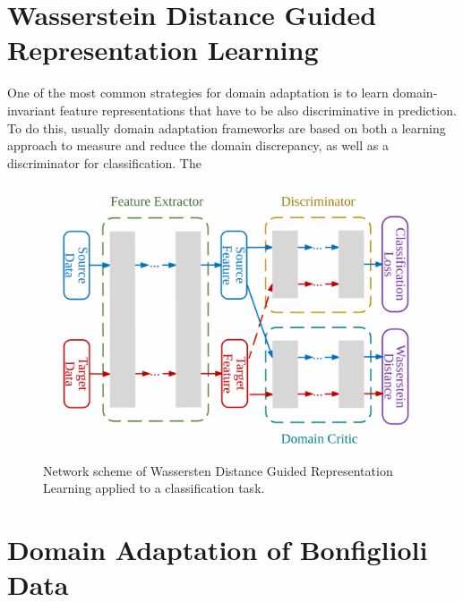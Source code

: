 \documentclass[../main.tex]{subfiles}
\begin{document}
\section{Wasserstein Distance Guided Representation Learning}

One of the most common strategies for domain adaptation is to learn domain-invariant feature representations that have to be also discriminative in
prediction. To do this, usually domain adaptation frameworks are based on both a learning approach to measure and reduce the domain discrepancy, as well as a discriminator for classification. The 

\begin{figure}[!ht]
	\centering
	\includegraphics{pictures/wdgrl_scheme}
	\caption{Network scheme of Wassersten Distance Guided Representation Learning applied to a classification task.}
	\label{fig:wdgrl_scheme}
\end{figure}



\section{Domain Adaptation of Bonfiglioli Data}
\end{document}
